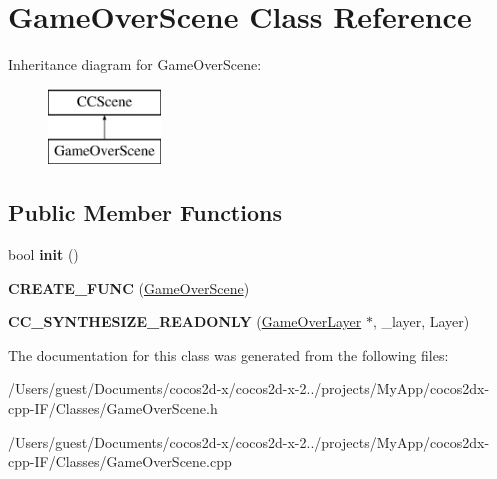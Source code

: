 \hypertarget{class_game_over_scene}{\section{Game\-Over\-Scene Class Reference}
\label{class_game_over_scene}
}
Inheritance diagram for Game\-Over\-Scene\-:\begin{figure}[H]
\begin{center}
\leavevmode
\includegraphics[height=2.000000cm]{class_game_over_scene}
\end{center}
\end{figure}
\subsection*{Public Member Functions}
\begin{DoxyCompactItemize}
\item 
\hypertarget{class_game_over_scene_a88368b68e893dbc0b0dbac447882ea98}{bool {\bfseries init} ()}\label{class_game_over_scene_a88368b68e893dbc0b0dbac447882ea98}

\item 
\hypertarget{class_game_over_scene_a605830606593b6cc4e237d99b80263e0}{{\bfseries C\-R\-E\-A\-T\-E\-\_\-\-F\-U\-N\-C} (\hyperlink{class_game_over_scene}{Game\-Over\-Scene})}\label{class_game_over_scene_a605830606593b6cc4e237d99b80263e0}

\item 
\hypertarget{class_game_over_scene_a4c0ed2c9e3d6b6a66146d7081f945910}{{\bfseries C\-C\-\_\-\-S\-Y\-N\-T\-H\-E\-S\-I\-Z\-E\-\_\-\-R\-E\-A\-D\-O\-N\-L\-Y} (\hyperlink{class_game_over_layer}{Game\-Over\-Layer} $\ast$, \-\_\-layer, Layer)}\label{class_game_over_scene_a4c0ed2c9e3d6b6a66146d7081f945910}

\end{DoxyCompactItemize}


The documentation for this class was generated from the following files\-:\begin{DoxyCompactItemize}
\item 
/\-Users/guest/\-Documents/cocos2d-\/x/cocos2d-\/x-\/2../projects/\-My\-App/cocos2dx-\/cpp-\/\-I\-F/\-Classes/Game\-Over\-Scene.\-h\item 
/\-Users/guest/\-Documents/cocos2d-\/x/cocos2d-\/x-\/2../projects/\-My\-App/cocos2dx-\/cpp-\/\-I\-F/\-Classes/Game\-Over\-Scene.\-cpp\end{DoxyCompactItemize}
